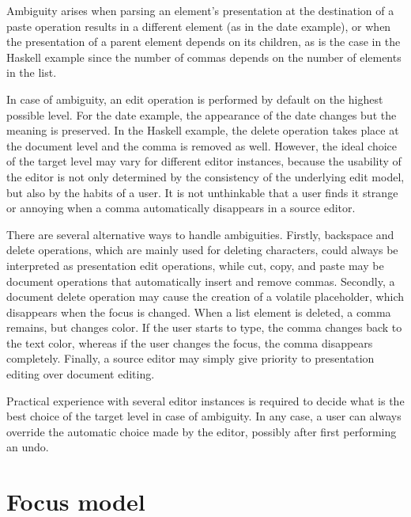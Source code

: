 Ambiguity arises when parsing an element's presentation at the destination of a paste operation results in a different element (as in the date example), or when the presentation of a parent element depends on its children, as is the case in the Haskell example since the number of commas depends on the number of elements in the list. 


In case of ambiguity, an edit operation is performed by default on the highest possible level. For the date example, the appearance of the date changes but the meaning is preserved. In the Haskell example, the delete operation takes place at the document level and the comma is removed as well. However, the ideal choice of the target level may vary for different editor instances, because the usability of the editor is not only determined by the consistency of the underlying edit model, but also by the habits of a user. It is not unthinkable that a user finds it strange or annoying when a comma automatically disappears in a source editor. 

There are several alternative ways to handle ambiguities. Firstly, backspace and delete operations, which are mainly used for deleting characters, could always be interpreted as presentation edit operations, while cut, copy, and paste may be document operations that automatically insert and remove commas. Secondly, a document delete operation may cause the creation of a volatile placeholder, which disappears when the focus is changed. When a list element is deleted, a comma remains, but changes color. If the user starts to type, the comma changes back to the text color, whereas if the user changes the focus, the comma disappears completely. Finally, a source editor may simply give priority to presentation editing over document editing. 

Practical experience with several editor instances is required to decide what is the best choice of the target level in case of ambiguity. In any case, a user can always override the automatic choice made by the editor, possibly after first performing an undo.



%									
%									
%									
\section{Focus model}

